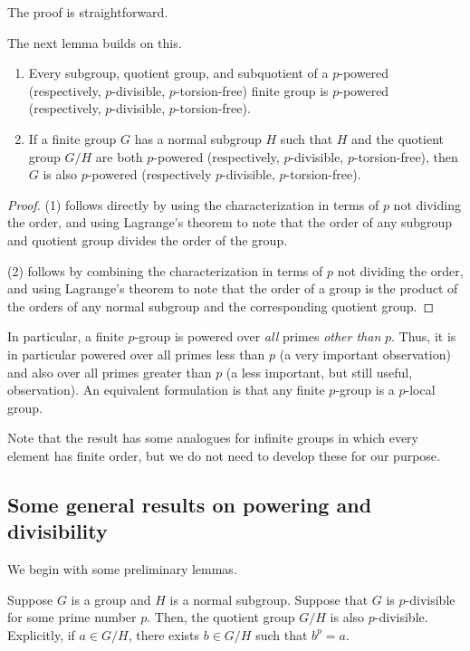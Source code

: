 \documentclass{ucetd}
\begin{document}
The proof is straightforward.

The next lemma builds on this.

\begin{lemma}
  \begin{enumerate}
  \item Every subgroup, quotient group, and subquotient of a
    $p$-powered (respectively, $p$-divisible, $p$-torsion-free) finite
    group is $p$-powered (respectively, $p$-divisible,
    $p$-torsion-free).
  \item If a finite group $G$ has a normal subgroup $H$ such that $H$
    and the quotient group $G/H$ are both $p$-powered (respectively,
    $p$-divisible, $p$-torsion-free), then $G$ is also $p$-powered
    (respectively $p$-divisible, $p$-torsion-free).
  \end{enumerate}
\end{lemma}

\begin{proof}
  (1) follows directly by using the characterization in terms of $p$
  not dividing the order, and using Lagrange's theorem to note that
  the order of any subgroup and quotient group divides the order of
  the group.

  (2) follows by combining the characterization in terms of $p$ not
  dividing the order, and using Lagrange's theorem to note that the
  order of a group is the product of the orders of any normal subgroup
  and the corresponding quotient group.
\end{proof}

In particular, a finite $p$-group is powered over {\em all} primes
{\em other than} $p$. Thus, it is in particular powered over all
primes less than $p$ (a very important observation) and also over all
primes greater than $p$ (a less important, but still useful,
observation). An equivalent formulation is that any finite $p$-group
is a $p$-local group.

Note that the result has some analogues for infinite groups in which
every element has finite order, but we do not need to develop these
for our purpose.

\subsection{Some general results on powering and divisibility}

We begin with some preliminary lemmas.

\begin{lemma}\label{divisibility-inherit-quotient}
  Suppose $G$ is a group and $H$ is a normal subgroup. Suppose that
  $G$ is $p$-divisible for some prime number $p$. Then, the quotient
  group $G/H$ is also $p$-divisible. Explicitly, if $a \in G/H$, there
  exists $b \in G/H$ such that $b^p = a$.
\end{lemma}
\end{document}
